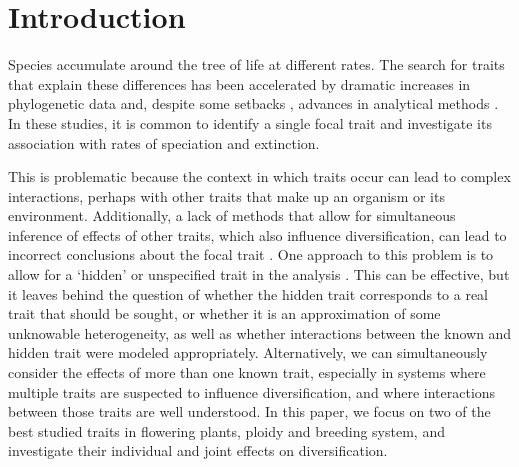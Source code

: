 \section{Introduction}

Species accumulate around the tree of life at different rates.
The search for traits that explain these differences has been accelerated by dramatic increases in phylogenetic data and, despite some setbacks \citep{maddison_2015, rabosky_2015}, advances in analytical methods \citep{maddison_2007, fitzjohn_2009, goldberg_2012, beaulieu_2016}. %
In these studies, it is common to identify a single focal trait and investigate its association with rates of speciation and extinction. %

This is problematic because the context in which traits occur can lead to complex interactions, perhaps with other traits that make up an organism or its environment.
Additionally, a lack of methods that allow for simultaneous inference of effects of other traits, which also influence diversification, can lead to incorrect conclusions about the focal trait \citep{rabosky_2015, beaulieu_2016}.
One approach to this problem is to allow for a `hidden' or unspecified trait in the analysis \citep{beaulieu_2016}. %
This can be effective, but it leaves behind the question of whether the hidden trait corresponds to a real trait that should be sought, or whether it is an approximation of some unknowable heterogeneity, as well as whether interactions between the known and hidden trait were modeled appropriately.
Alternatively, we can simultaneously consider the effects of more than one known trait, especially in systems where multiple traits are suspected to influence diversification, and where interactions between those traits are well understood.
In this paper, we focus on two of the best studied traits in flowering plants, ploidy and breeding system, and investigate their individual and joint effects on diversification.

